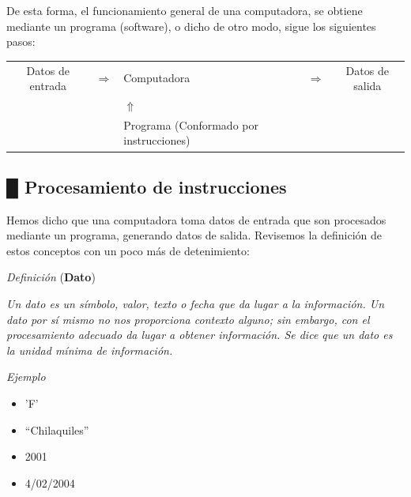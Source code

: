 \documentclass[11pt,spanish]{article}
\providecommand{\tabularnewline}{\\}
\begin{document}
De esta forma, el funcionamiento general de una computadora, se obtiene
mediante un programa (software), o dicho de otro modo, sigue los siguientes
pasos:
\begin{center}
\emph{}%
\begin{tabular}{cc>{\centering}p{5cm}cc}
Datos de entrada & $\Rightarrow$ & Computadora & $\Rightarrow$ & Datos de salida\tabularnewline
 &  & $\Uparrow$ &  & \tabularnewline
 &  & Programa (Conformado por instrucciones) &  & \tabularnewline
\end{tabular}
\par\end{center}

\subsection*{\color{celestialblue}█ \quad{}\color{black}Procesamiento de instrucciones}

Hemos dicho que una computadora toma datos de entrada que son procesados
mediante un programa, generando datos de salida. Revisemos la definición
de estos conceptos con un poco más de detenimiento:

\begin{bclogo}[noborder=true, couleurBarre=celestialblue,arrondi =0.1, couleur =anti-flashwhite, logo=\bcplume, marge =10]{\textit{Definición} (\textbf{Dato})}
\vspace{0.25cm}

\emph{Un dato es un símbolo, valor, texto o fecha que da lugar a la
información. Un dato por sí mismo no nos proporciona contexto alguno; sin
embargo, con el procesamiento adecuado da lugar a obtener información. Se
dice que un dato es la unidad mínima de información.}

\vspace{0.25cm}       
\end{bclogo}

\begin{bclogo}[noborder=true, couleurBarre=celestialblue,arrondi =0.1, couleur =anti-flashwhite, logo=\bccrayon, marge =10]{\textit{Ejemplo}}
\vspace{0.25cm}
\begin{itemize}
\item 'F'
\item ``Chilaquiles''
\item 2001
\item 4/02/2004
\end{itemize}
\vspace{0.25cm}       
\end{bclogo}
\end{document}
